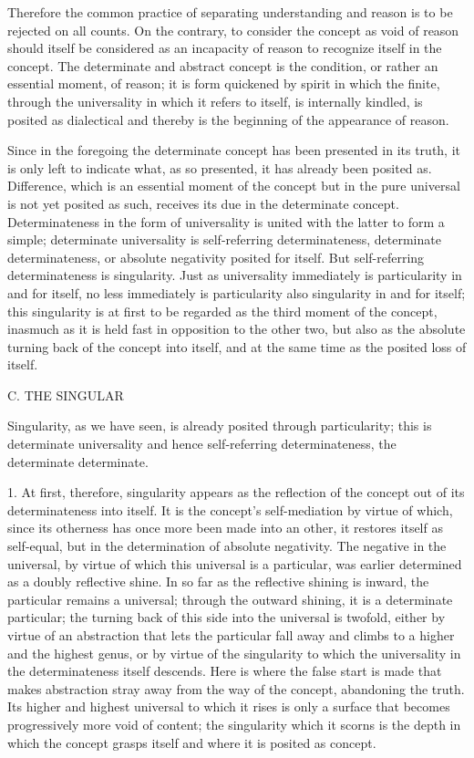 Therefore the common practice
of separating understanding and reason
is to be rejected on all counts.
On the contrary, to consider the concept
as void of reason should itself be
considered as an incapacity of reason
to recognize itself in the concept.
The determinate and abstract concept is the condition,
or rather an essential moment, of reason;
it is form quickened by spirit in which the finite,
through the universality in which it refers to itself,
is internally kindled, is posited as dialectical
and thereby is the beginning of the appearance of reason.

Since in the foregoing the determinate concept
has been presented in its truth,
it is only left to indicate what, as so presented,
it has already been posited as.
Difference, which is an essential moment of the concept
but in the pure universal is not yet posited as such,
receives its due in the determinate concept.
Determinateness in the form of universality is
united with the latter to form a simple;
determinate universality is self-referring determinateness,
determinate determinateness,
or absolute negativity posited for itself.
But self-referring determinateness is singularity.
Just as universality immediately is
particularity in and for itself,
no less immediately is particularity also
singularity in and for itself;
this singularity is at first to be regarded as
the third moment of the concept,
inasmuch as it is held fast
in opposition to the other two,
but also as the absolute turning back
of the concept into itself,
and at the same time
as the posited loss of itself.

C. THE SINGULAR

Singularity, as we have seen, is
already posited through particularity;
this is determinate universality
and hence self-referring determinateness,
the determinate determinate.

1. At first, therefore, singularity appears
as the reflection of the concept
out of its determinateness into itself.
It is the concept's self-mediation by virtue of which,
since its otherness has once more been made into an other,
it restores itself as self-equal,
but in the determination of absolute negativity.
The negative in the universal,
by virtue of which this universal is a particular,
was earlier determined as a doubly reflective shine.
In so far as the reflective shining is inward,
the particular remains a universal;
through the outward shining,
it is a determinate particular;
the turning back of this side
into the universal is twofold,
either by virtue of an abstraction
that lets the particular fall away
and climbs to a higher and the highest genus,
or by virtue of the singularity
to which the universality in
the determinateness itself descends.
Here is where the false start is made
that makes abstraction stray away
from the way of the concept,
abandoning the truth.
Its higher and highest universal
to which it rises is  only a surface
that becomes progressively more void of content;
the singularity which it scorns is
the depth in which the concept grasps itself
and where it is posited as concept.

